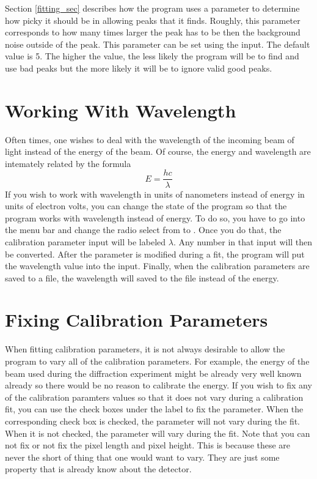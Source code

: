 Section \ref{fitting_sec} describes how the program
uses a parameter to determine how picky it should
be in allowing peaks that it finds. Roughly, this
parameter corresponds to how many times larger
the peak has to be then the background noise outside
of the peak. This parameter can be set using the 
 input. The default value is 5. The higher 
the value, the less likely the program will be to find
and use bad peaks but the more likely it will be to
ignore valid good peaks.

\section{Working With Wavelength}
\label{workWavelength}

Often times, one wishes to deal with the wavelength 
of the incoming beam of light instead of the energy
of the beam. Of course, the energy and wavelength
are intemately related by the formula
\begin{equation}
    E=\frac{hc}{\lambda}
\end{equation}
If you wish to work with wavelength in units of
nanometers instead of energy in units of electron 
volts, you can change the state of the program so 
that the program works with wavelength instead
of energy. To do so, you have to go into the menu bar
and change the radio select from 
to . Once you do that, the 
calibration parameter input will be labeled
$\lambda$. Any number in that input will then be converted.
After the parameter is modified during a fit,
the program will put the wavelength value into
the input. Finally, when the calibration
parameters are saved to a file, the wavelength will
saved to the file instead of the energy.


\section{Fixing Calibration Parameters}
\label{fix_parameters}

When fitting calibration parameters, it is not
always desirable to allow the program to vary
all of the calibration parameters. For example,
the energy of the beam used during the diffraction
experiment might be already very well known already
so there would be no reason to calibrate the energy.
If you wish to fix any of the calibration paramters
values so that it does not vary during a calibration
fit, you can use the check boxes under the 
label to fix the parameter. When the corresponding
check box is checked, the parameter will not vary
during the fit. When it is not checked, the
parameter will vary during the fit. Note that you
can not fix or not fix the pixel length and 
pixel height. This is because these are never
the short of thing that one would want to vary.
They are just some property that is already know
about the detector. 

